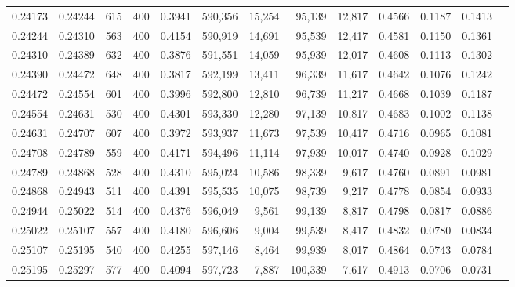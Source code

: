 \begin{tabular}{rrrrrrrrrrrrr}
0.24173 & 0.24244 &    615 &   400 &                                     0.3941 & 590,356 &  15,254 &  95,139 &  12,817 & 0.4566 & 0.1187 & 0.1413 \\
0.24244 & 0.24310 &    563 &   400 &                                     0.4154 & 590,919 &  14,691 &  95,539 &  12,417 & 0.4581 & 0.1150 & 0.1361 \\
0.24310 & 0.24389 &    632 &   400 &                                     0.3876 & 591,551 &  14,059 &  95,939 &  12,017 & 0.4608 & 0.1113 & 0.1302 \\
0.24390 & 0.24472 &    648 &   400 &                                     0.3817 & 592,199 &  13,411 &  96,339 &  11,617 & 0.4642 & 0.1076 & 0.1242 \\
0.24472 & 0.24554 &    601 &   400 &                                     0.3996 & 592,800 &  12,810 &  96,739 &  11,217 & 0.4668 & 0.1039 & 0.1187 \\
0.24554 & 0.24631 &    530 &   400 &                                     0.4301 & 593,330 &  12,280 &  97,139 &  10,817 & 0.4683 & 0.1002 & 0.1138 \\
0.24631 & 0.24707 &    607 &   400 &                                     0.3972 & 593,937 &  11,673 &  97,539 &  10,417 & 0.4716 & 0.0965 & 0.1081 \\
0.24708 & 0.24789 &    559 &   400 &                                     0.4171 & 594,496 &  11,114 &  97,939 &  10,017 & 0.4740 & 0.0928 & 0.1029 \\
0.24789 & 0.24868 &    528 &   400 &                                     0.4310 & 595,024 &  10,586 &  98,339 &   9,617 & 0.4760 & 0.0891 & 0.0981 \\
0.24868 & 0.24943 &    511 &   400 &                                     0.4391 & 595,535 &  10,075 &  98,739 &   9,217 & 0.4778 & 0.0854 & 0.0933 \\
0.24944 & 0.25022 &    514 &   400 &                                     0.4376 & 596,049 &   9,561 &  99,139 &   8,817 & 0.4798 & 0.0817 & 0.0886 \\
0.25022 & 0.25107 &    557 &   400 &                                     0.4180 & 596,606 &   9,004 &  99,539 &   8,417 & 0.4832 & 0.0780 & 0.0834 \\
0.25107 & 0.25195 &    540 &   400 &                                     0.4255 & 597,146 &   8,464 &  99,939 &   8,017 & 0.4864 & 0.0743 & 0.0784 \\
0.25195 & 0.25297 &    577 &   400 &                                     0.4094 & 597,723 &   7,887 & 100,339 &   7,617 & 0.4913 & 0.0706 & 0.0731 \\

\end{tabular}

